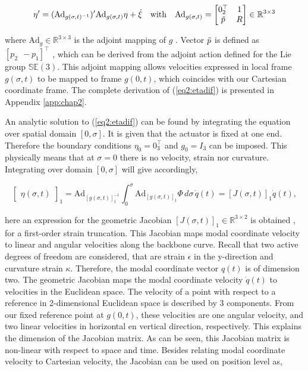 \begin{equation}
    \eta'= (\text{Ad}_{g(\sigma,t)^{-1}})'\text{Ad}_{g(\sigma,t)} \eta + \Dot{\xi} \hspace{10pt} \text{with} \hspace{10pt} \text{Ad}_{g(\sigma,t)} = \begin{bmatrix} 0_2^\top & 1 \\ \Tilde{p} & R  \end{bmatrix} \in \mathbb{R}^{3\times 3}
    \label{eq2:etadif}
\end{equation}


where $\text{Ad}_g \in \mathbb{R}^{3 \times 3}$ \cite{2DLie} is the adjoint mapping of $g$ \cite{Sola2018}. Vector $\Tilde{p}$ is defined as $[p_2 \hspace{5pt} -p_1]^\top$ \cite{2DLie}, which can be derived from the adjoint action defined for the Lie group $\mathbb{SE}(3)$. This adjoint mapping allows velocities expressed in local frame $g(\sigma,t)$ to be mapped to frame $g(0,t)$, which coincides with our Cartesian coordinate frame. The complete derivation of (\ref{eq2:etadif}) is presented in Appendix \ref{app:chap2}. 

An analytic solution to (\ref{eq2:etadif}) can be found by integrating the equation over spatial domain $[0,\sigma]$. It is given that the actuator is fixed at one end. Therefore the boundary conditions $\eta_0 = 0_{3}^\top$ and $g_0 = I_{3}$ can be imposed. This physically means that at $\sigma = 0$ there is no velocity, strain nor curvature. Integrating over domain $[0,\sigma]$ will give accordingly,

\begin{equation}
  \begin{bmatrix} \eta(\sigma,t)\end{bmatrix}_1 = \text{Ad}_{[g(\sigma,t)]_1^{-1}} \int_0^{\sigma} \text{Ad}_{[g(\sigma,t)]_1} \Phi \hspace{2pt} d \sigma  \hspace{2pt} \dot{q}(t) = [J(\sigma,t)]_1\dot{q}(t),
    \label{eq2:J}
\end{equation}

here an expression for the geometric Jacobian $[J(\sigma,t)]_1 \in \mathbb{R}^{3\times 2}$ is obtained \cite{Caasenbrood2020}, for a first-order strain truncation. This Jacobian maps modal coordinate velocity to linear and angular velocities along the backbone curve. Recall that two active degrees of freedom are considered, that are strain $\epsilon$ in the y-direction and curvature strain $\kappa$. Therefore, the modal coordinate vector $q(t)$ is of dimension two. The geometric Jacobian maps the modal coordinate velocity $\dot{q}(t)$ to velocities in the Euclidean space. The velocity of a point with respect to a reference in 2-dimensional Euclidean space is described by 3 components. From our fixed reference point at $g(0,t)$, these velocities are one angular velocity, and two linear velocities in horizontal en vertical direction, respectively. This explains the dimension of the Jacobian matrix. As can be seen, this Jacobian matrix is non-linear with respect to space and time. Besides relating modal coordinate velocity to Cartesian velocity, the Jacobian can be used on position level as,

